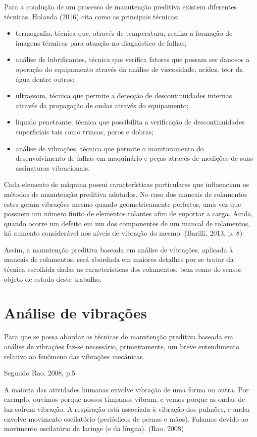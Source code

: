 \documentclass[
	12pt,				
	oneside,			
	a4paper,			
	english,			
	brazil				
	]{abntex2ppgsi}
\begin{document}
Para a condução de um processo de manutenção preditiva existem diferentes técnicas. Holanda (2016) cita como as principais técnicas: 
\begin{itemize}
	\item termografia, técnica que, através de temperatura, realiza a formação de imagens térmicas para atuação no diagnóstico de falhas; 
	\item análise de lubrificantes, técnica que verifica fatores que possam ser danosos a operação do equipamento através da análise de viscosidade, acidez, teor da água dentre outros; 
	\item ultrassom, técnica que permite a detecção de descontinuidades internas através da propagação de ondas através do equipamento; 
	\item líquido penetrante, técnica que possibilita a verificação de descontinuidades superficiais tais como trincas, poros e dobras; 
	\item análise de vibrações, técnica que permite o monitoramento do desenvolvimento de falhas em maquinário e peças através de medições de suas assinaturas vibracionais. 
\end{itemize}

Cada elemento de máquina possui características particulares que influenciam os métodos de manutenção preditiva adotados. No caso dos mancais de rolamentos estes geram vibrações mesmo quando geometricamente perfeitos, uma vez que possuem um número finito de elementos rolantes afim de suportar a carga. Ainda, quando ocorre um defeito em um dos componentes de um mancal de rolamentos, há aumento considerável nos níveis de vibração do mesmo. (Barilli, 2013, p. 8)

Assim, a manutenção preditiva baseada em análise de vibrações, aplicada à mancais de rolamentos, será abordada em maiores detalhes por se tratar da técnica escolhida dadas as características dos rolamentos, bem como do sensor objeto de estudo deste trabalho.

\section{\textbf{Análise de vibrações}}

Para que se possa abordar as técnicas de manutenção preditiva baseada em análise de vibrações faz-se necessário, primeiramente, um breve entendimento relativo ao fenômeno das vibrações mecânicas. 

Segundo Rao, 2008, p.5

\begin{citacao}
A maioria das atividades humanas envolve vibração de uma forma ou outra. Por exemplo, ouvimos porque nossos tímpanos vibram, e vemos porque as ondas de luz sofrem vibração. A respiração está associada à vibração dos pulmões, e andar envolve movimento oscilatório (periódicos de pernas e mãos). Falamos devido ao movimento oscilatório da laringe (e da língua). (Rao, 2008)
\end{citacao}
\end{document}
